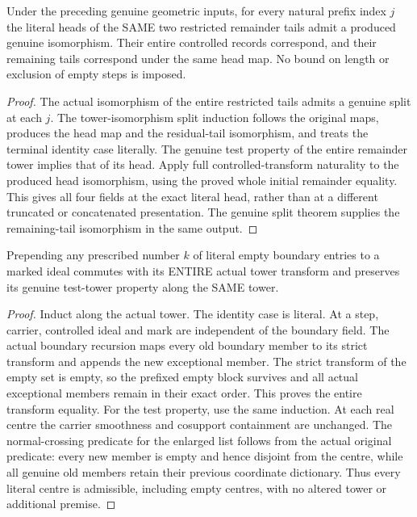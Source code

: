 \begin{theorem}
\label{hir:zero-contact-tail-every-prefix}
\leanok
{}
Under the preceding genuine geometric inputs, for every natural prefix
index $j$ the literal heads of the SAME two restricted remainder tails
admit a produced genuine isomorphism. Their entire controlled records
correspond, and their remaining tails correspond under the same head map.
No bound on length or exclusion of empty steps is imposed.
\end{theorem}
\begin{proof}
The actual isomorphism of the entire restricted tails admits a genuine
split at each $j$. The tower-isomorphism split induction follows the
original maps, produces the head map and the residual-tail isomorphism,
and treats the terminal identity case literally. The genuine test property
of the entire remainder tower implies that of its head. Apply full
controlled-transform naturality to the produced head isomorphism,
using the proved whole initial remainder equality. This gives all four
fields at the exact literal head, rather than at a different truncated
or concatenated presentation. The genuine split theorem supplies the
remaining-tail isomorphism in the same output.
\end{proof}

\begin{theorem}
\label{hir:zero-contact-tail-empty-history}
\leanok
{}
Prepending any prescribed number $k$ of literal empty boundary entries
to a marked ideal commutes with its ENTIRE actual tower transform and
preserves its genuine test-tower property along the SAME tower.
\end{theorem}
\begin{proof}
Induct along the actual tower. The identity case is literal. At a step,
carrier, controlled ideal and mark are independent of the boundary field.
The actual boundary recursion maps every old boundary member to its strict
transform and appends the new exceptional member. The strict transform
of the empty set is empty, so the prefixed empty block survives and all
actual exceptional members remain in their exact order. This proves the
entire transform equality. For the test property, use the same induction.
At each real centre the carrier smoothness and cosupport containment are
unchanged. The normal-crossing predicate for the enlarged list follows
from the actual original predicate: every new member is empty and hence
disjoint from the centre, while all genuine old members retain their
previous coordinate dictionary. Thus every literal centre is admissible,
including empty centres, with no altered tower or additional premise.
\end{proof}

